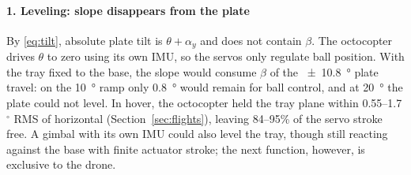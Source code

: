 \paragraph{1. Leveling: slope disappears from the plate}
By \eqref{eq:tilt}, absolute plate tilt is $\theta+\alpha_y$ and does not contain $\beta$. The octocopter drives $\theta$ to zero using its own IMU, so the servos only regulate ball position. With the tray fixed to the base, the slope would consume $\beta$ of the \SI{\pm10.8}{\degree} plate travel: on the \SI{10}{\degree} ramp only \SI{0.8}{\degree} would remain for ball control, and at \SI{20}{\degree} the plate could not level. In hover, the octocopter held the tray plane within 0.55--1.7$^\circ$ RMS of horizontal (Section~\ref{sec:flights}), leaving 84--95\% of the servo stroke free. A gimbal with its own IMU could also level the tray, though still reacting against the base with finite actuator stroke; the next function, however, is exclusive to the drone.

